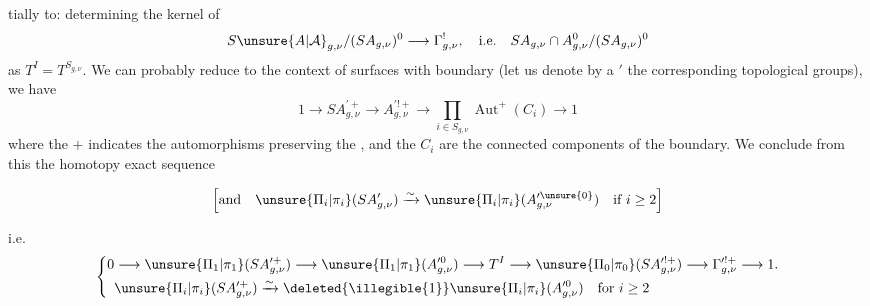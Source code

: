 tially to: determining the kernel of
\[
S\unsure{A|\mathcal A}_{g,\nu}/(SA_{g,\nu})^0\longrightarrow\Gamma^!_{g,\nu},
\quad\text{i.e.}\quad
SA_{g,\nu}\cap A_{g,\nu}^0/(SA_{g,\nu})^0
\]
as $T^I=T^{S_{g,\nu}}$. We can probably reduce to the context of  surfaces with boundary (let us denote by a $'$ the corresponding topological groups), we have
\[
1\longrightarrow SA_{g,\nu}^{\prime+}\longrightarrow
A_{g,\nu}^{\prime!+}\longrightarrow
\prod_{i\in S_{g,\nu}}\operatorname{Aut}^+(C_i)\longrightarrow1
\]
where the $+$ indicates the automorphisms preserving the , and the $C_i$ are the connected components of the boundary. We conclude from this the homotopy exact sequence
\begin{landscape}
\begin{center}
\end{center}
\end{landscape}
\[
\left[\text{and}\quad
\unsure{\Pi_i|\pi_i}(SA'_{g,\nu})\xrightarrow{\sim}
\unsure{\Pi_i|\pi_i}(A_{g,\nu}^{\prime\unsure{0}})
\quad\text{if }i\geq2\right]
\]

i.e.
\[
\left\{\begin{aligned}
0&\longrightarrow\unsure{\Pi_1|\pi_1}(SA_{g,\nu}^{\prime+})
\longrightarrow\unsure{\Pi_1|\pi_1}(A_{g,\nu}^{\prime0})
\longrightarrow T^I\longrightarrow\unsure{\Pi_0|\pi_0}(SA_{g,\nu}^{\prime!+})
\longrightarrow\Gamma_{g,\nu}^{\prime!+}\longrightarrow1.\\
&\unsure{\Pi_i|\pi_i}(SA_{g,\nu}^{\prime+})\xrightarrow{\sim}
\deleted{\illegible{1}}\unsure{\Pi_i|\pi_i}(A_{g,\nu}^{\prime0})
\quad\text{for }i\geq2
\end{aligned}\right.
\]

